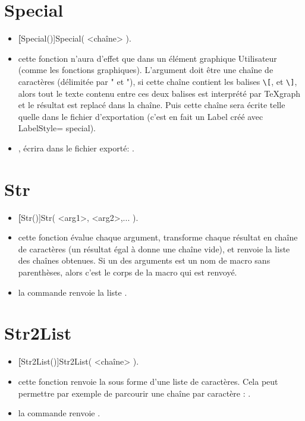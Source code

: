 \section{Special}\label{cmdSpecial}

\begin{itemize}
 \item \util \textbf[Special()]{Special( <chaîne> )}.
 \item \desc cette fonction n'aura d'effet que dans un élément graphique Utilisateur (comme les fonctions graphiques). L'argument doit être une chaîne de caractères (délimitée par " et "), si cette chaîne contient les balises \verb|\[|, et \verb|\]|, alors tout le texte contenu entre ces deux balises est interprété par TeXgraph et le résultat est replacé dans la chaîne. Puis cette chaîne sera écrite telle quelle dans le fichier d'exportation (c'est en fait un Label créé avec LabelStyle= special).
 \item \exem {}, écrira dans le fichier exporté: .
\end{itemize}

\section{Str}\label{cmdStr}

\begin{itemize}
 \item \util \textbf[Str()]{Str( <arg1>, <arg2>,... )}.
 \item \desc cette fonction évalue chaque argument, transforme chaque résultat en chaîne de caractères (un résultat égal à \Nil donne une chaîne vide), et renvoie la liste des chaînes obtenues. Si un des arguments est un nom de macro sans parenthèses, alors c'est le corps de la macro qui est renvoyé.
 \item \exem la commande  renvoie la liste \res{["3.14159265358979","","A","[1,2,3]"]}.
\end{itemize}

\section{Str2List}\label{Str2List}

\begin{itemize}
 \item \util \textbf[Str2List()]{Str2List( <chaîne> )}.
 \item \desc cette fonction renvoie la  sous forme d'une liste de caractères. Cela peut permettre par exemple de parcourir une chaîne par caractère : .
 \item \exem la commande  renvoie \res{["t","o","t","o"]}.

\end{itemize}

